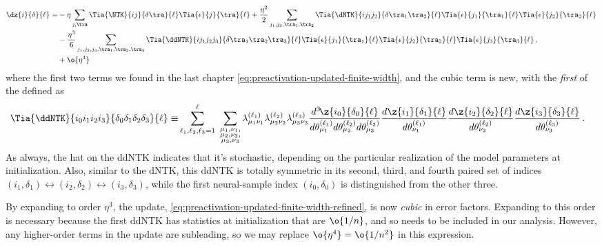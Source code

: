 \begin{align}\label{eq:preactivation-updated-finite-width-refined}
\dz{i}{\delta}{\ell}=&-\eta\sum_{j,\tra}\Tia{\NTK}{ij}{\delta\tra}{\ell}\Tia{\epsilon}{j}{\tra}{\ell}+\frac{\eta^2}{2}\sum_{j_1,j_2,\tra_1,\tra_2}\Tia{\dNTK}{i j_1j_2}{\delta\tra_1\tra_2}{\ell}  \Tia{\epsilon}{j_1}{\tra_1}{\ell}\Tia{\epsilon}{j_2}{\tra_2}{\ell}\, \\
&-\frac{\eta^3}{6}\sum_{j_1,j_2,j_3,\tra_1,\tra_2,\tra_3}\Tia{\ddNTK}{i j_1j_2j_3}{\delta\tra_1\tra_2\tra_3}{\ell}  \Tia{\epsilon}{j_1}{\tra_1}{\ell}\Tia{\epsilon}{j_2}{\tra_2}{\ell}\Tia{\epsilon}{j_3}{\tra_3}{\ell}\, , \notag\\
&+\o{\eta^4}\, \notag
\end{align}
where the first two terms we found in the last chapter \eqref{eq:preactivation-updated-finite-width}, and the cubic term is new, with the \emph{first} of the  defined as
\begin{align}
\Tia{\ddNTK}{i_0i_1i_2i_3}{\delta_0 \delta_1\delta_2\delta_3}{\ell}\equiv&\sum_{\ell_1, \ell_2,\ell_3=1}^\ell\,\, \sum_{\substack{\mu_1,\nu_1, \\ \mu_2,\nu_2, \\ \mu_3,\nu_3} }\lambda_{\mu_1\nu_1}^{(\ell_1)}\lambda_{\mu_2\nu_2}^{(\ell_2)}\lambda_{\mu_3\nu_3}^{(\ell_3)}\frac{d^3\!\z{i_0}{\delta_0}{\ell}}{d\theta^{(\ell_1)}_{\mu_1}d\theta^{(\ell_2)}_{\mu_2}d\theta^{(\ell_3)}_{\mu_3}}\frac{d\z{i_1}{\delta_1}{\ell}}{d\theta^{(\ell_1)}_{\nu_1}}\frac{d\z{i_2}{\delta_2}{\ell}}{d\theta^{(\ell_2)}_{\nu_2}}\frac{d\z{i_3}{\delta_3}{\ell}}{d\theta^{(\ell_3)}_{\nu_3}} \, .\label{eq:ddNTK-definition}
\end{align}
As always, the hat on the ddNTK indicates that it's stochastic, depending on the particular realization of the model parameters at initialization. Also, similar to the dNTK, this ddNTK is totally symmetric in its second, third, and fourth paired set of indices $(i_1, \delta_1) \leftrightarrow (i_2, \delta_2) \leftrightarrow (i_3, \delta_3)$, while the first neural-sample index $(i_0, \delta_0)$ is distinguished from the other three.

By expanding to order $\eta^3$, the update, \eqref{eq:preactivation-updated-finite-width-refined}, is now \emph{cubic} in error factors. Expanding to this order is necessary because the first ddNTK has statistics at initialization that are $\o{1/n}$, and so needs to be included in our analysis. However, any higher-order terms in the update are subleading, so we may replace $\o{\eta^4} = \o{1/n^2}$ in this expression.

